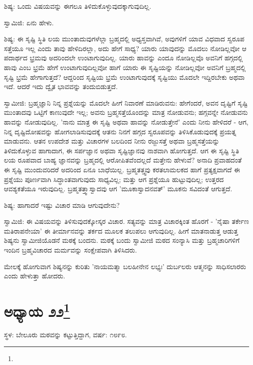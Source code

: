 ಶಿಷ್ಯ: ಒಂದು ವಿಷಯವನ್ನು ಈಗಲೂ ತಿಳಿದುಕೊಳ್ಳುವುದಕ್ಕಾಗುವುದಿಲ್ಲ.

ಸ್ವಾಮಿಜಿ: ಏನು ಹೇಳು.

ಶಿಷ್ಯ: ಈ ಸೃಷ್ಟಿ ಸ್ಥಿತಿ ಲಯ ಮುಂತಾದುವುಗಳೆಲ್ಲಾ ಬ್ರಹ್ಮದಲ್ಲಿ ಅಧ್ಯಸ್ತವಾಗಿವೆ, ಅವುಗಳಿಗೆ ಯಾವ ವಿಧವಾದ ಸ್ವರೂಪ ಸತ್ತೆಯೂ ಇಲ್ಲ ಎಂದು ತಾವು ಹೇಳಿದಿರಲ್ಲಾ, ಅದು ಹೇಗೆ ಸಾಧ್ಯ? ಯಾರು ಯಾವುದನ್ನು ಮೊದಲು ನೋಡಿಲ್ಲವೋ ಆ ಪದಾರ್ಥದ ಭ್ರಮವು ಅದರಿಂದಲೇ ಉಂಟಾಗುವುದಿಲ್ಲ. ಯಾರು ಹಾವನ್ನು ಎಂದೂ ನೋಡಿಲ್ಲವೊ ಅವನಿಗೆ ಹಗ್ಗದಲ್ಲಿ ಹಾವು ಎಂಬ ಭ್ರಮೆ ಹೇಗೆ ಉಂಟಾಗುವುದಿಲ್ಲವೋ ಹಾಗೆ ಯಾರು ಈ ಸೃಷ್ಟಿಯನ್ನು ನೋಡಿಲ್ಲವೋ ಅವನಿಗೆ ಬ್ರಹ್ಮದಲ್ಲಿ ಸೃಷ್ಟಿ ಭ್ರಮೆ ಹೇಗಾಗುತ್ತದೆ? ಆದ್ದರಿಂದ ಸೃಷ್ಟಿಯ ಭ್ರಮೆ ಉಂಟಾಗುವುದಕ್ಕೆ ಸೃಷ್ಟಿಯು ಮೊದಲೇ ಇದ್ದಿರಬೇಕು ಅಥವಾ ಇದೆ. ಆದರೆ ಇದು ದ್ವೈತ ಭಾವವನ್ನು ತಂದುಬಿಡುತ್ತದೆ.

ಸ್ವಾಮೀಜಿ: ಬ್ರಹ್ಮಜ್ಞಾನಿ ನಿನ್ನ ಪ್ರಶ್ನೆಯನ್ನು ಮೊದಲೇ ಹೀಗೆ ನಿವಾರಣೆ ಮಾಡಿರುವನು: ಹೇಗೆಂದರೆ, ಅವನ ದೃಷ್ಟಿಗೆ ಸೃಷ್ಟಿ ಮುಂತಾದವು ಒಟ್ಟಿಗೆ ಕಾಣುವುದೇ ಇಲ್ಲ; ಅವನು ಬ್ರಹ್ಮಸತ್ತೆಯೊಂದನ್ನು ಮಾತ್ರ ನೋಡುವನು; ಹಗ್ಗವನ್ನೇ ನೋಡುವನು ಹಾವನ್ನು ನೋಡುವುದಿಲ್ಲ. 'ನಾನು ಮಾತ್ರ ಈ ಸೃಷ್ಟಿ ಅಥವಾ ಹಾವನ್ನು ನೋಡುತ್ತೇನೆ' ಎಂದು ನೀನು ಹೇಳಿದರೆ - ಆಗ, ನಿನ್ನ ದೃಷ್ಟಿದೋಷವನ್ನು ಹೋಗಲಾಡಿಸುವುದಕ್ಕೆ ಆತನು ನಿನಗೆ ಹಗ್ಗದ ಸ್ವರೂಪವನ್ನು ತಿಳಿಸಿಕೊಡುವುದಕ್ಕೆ ಪ್ರಯತ್ನ ಮಾಡುವನು. ಆತನ ಉಪದೇಶ ಮತ್ತು ವಿಚಾರಗಳ ಬಲದಿಂದ ನೀನು ರಜ್ಜುಸತ್ತೆ ಅಥವಾ ಬ್ರಹ್ಮಸತ್ತೆಯನ್ನು ತಿಳಿದುಕೊಳ್ಳುವ ಹಾಗಾದಾಗ, ಈ ಸರ್ಪಜ್ಞಾನ ಅಥವಾ ಸೃಷ್ಟಿಜ್ಞಾನವು ನಾಶವಾಗಿ ಹೋಗುತ್ತದೆ. ಆಗ ಈ ಸೃಷ್ಟಿ ಸ್ಥಿತಿ ಲಯ ರೂಪವಾದ ಬಾಹ್ಯ ಜ್ಞಾನವನ್ನು ಬ್ರಹ್ಮದಲ್ಲಿ ಆರೋಪಿತವೆಂದಲ್ಲದೆ ಮತ್ತೇನು ಹೇಳುವೆ? ಅನಾದಿ ಪ್ರವಾಹದಂತೆ ಈ ಸೃಷ್ಟಿ ಮುಂದುವರಿದರೆ ಅದರಿಂದ ಏನೂ ಬಾಧೆಯಿಲ್ಲ. ಬ್ರಹ್ಮತತ್ತ್ವವು ಕರತಲಾಮಲಕದ ಹಾಗೆ ಪ್ರತ್ಯಕ್ಷವಾಗದೆ ಈ ಪ್ರಶ್ನೆಯು ಪೂರ್ಣವಾಗಿ ಸಿದ್ಧಾಂತವಾಗುವುದು ಸಾಧ್ಯವಿಲ್ಲ; ಮತ್ತು ಆಗ ಪ್ರಶ್ನೆಯೂ ಹುಟ್ಟುವುದಿಲ್ಲ; ಉತ್ತರದ ಆವಶ್ಯಕತೆಯೂ ಇರುವುದಿಲ್ಲ. ಬ್ರಹ್ಮತತ್ತ್ವಾಸ್ವಾದವು ಆಗ 'ಮೂಕಾಸ್ವಾದನವತ್' ಮೂಕನು ಸವಿದಂತೆ ಆಗುತ್ತದೆ.

ಶಿಷ್ಯ: ಹಾಗಾದರೆ ಇಷ್ಟು ವಿಚಾರ ಮಾಡಿ ಆಗುವುದೇನು?

ಸ್ವಾಮಿಜಿ: ಈ ವಿಷಯವನ್ನು ತಿಳಿಸುವುದಕ್ಕೋಸ್ಕರ ವಿಚಾರ. ಸತ್ಯವನ್ನು ಮಾತ್ರ ವಿಚಾರಕ್ಕಿಂತ ಹೊರಗೆ - 'ನೈಷಾ ತರ್ಕೇಣ ಮತಿರಾಪನೇಯಾ' ಈ ತೀರ್ಮಾನವನ್ನು ತರ್ಕದ ಮೂಲಕ ತಲುಪಲು ಆಗುವುದಿಲ್ಲ. ಹೀಗೆ ಮಾತನಾಡುತ್ತ ಆಡುತ್ತ ಶಿಷ್ಯನು ಸ್ವಾಮೀಜಿಯೊಡನೆ ಮಠಕ್ಕೆ ಬಂದನು. ಮಠಕ್ಕೆ ಬಂದು ಸ್ವಾಮೀಜಿ ಮಠದ ಸಂನ್ಯಾಸಿ ಮತ್ತು ಬ್ರಹ್ಮಚಾರಿಗಳಿಗೆ ಇಂದಿನ ಬ್ರಹ್ಮವಿಚಾರದ ಮರ್ಮವನ್ನು ಸಂಕ್ಷೇಪವಾಗಿ ತಿಳಿಸಿದರು.

ಮೇಲಕ್ಕೆ ಹೋಗುವಾಗ ಶಿಷ್ಯನನ್ನು ಕುರಿತು 'ನಾಯಮತ್ಮಾ ಬಲಹೀನೇನ ಲಭ್ಯಃ' ದುರ್ಬಲರು ಆತ್ಮನನ್ನು ಸಾಧಿಸಲಾರರು ಎಂದು ಹೇಳುತ್ತಾ ಹೋದರು.

\newpage

\chapter[ಅಧ್ಯಾಯ ೨೨]{ಅಧ್ಯಾಯ ೨೨\protect\footnote{}}

\begin{center}
ಸ್ಥಳ: ಬೇಲೂರು ಮಠವನ್ನು ಕಟ್ಟುತ್ತಿದ್ದಾಗ, ವರ್ಷ: ೧೮೯೮.
\end{center}

